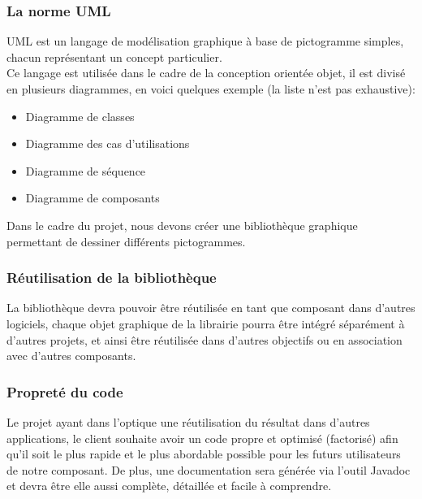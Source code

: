 \documentclass[12pt,a4paper,openany]{article}
\begin{document}
		\subsubsection{La norme UML} 
			UML est un langage de modélisation graphique à base de pictogramme simples, chacun représentant un concept particulier.\\
			Ce langage est utilisée dans le cadre de la conception orientée objet, il est divisé en plusieurs diagrammes, en voici quelques exemple (la liste n'est pas exhaustive): 
			\begin{itemize}
				\item Diagramme de classes
				\item Diagramme des cas d'utilisations
				\item Diagramme de séquence
				\item Diagramme de composants
			\end{itemize}
			Dans le cadre du projet, nous devons créer une bibliothèque graphique permettant de dessiner différents pictogrammes.
		\subsubsection{Réutilisation de la bibliothèque}
		La bibliothèque devra pouvoir être réutilisée en tant que composant dans d'autres logiciels,
		chaque objet graphique de la librairie pourra être intégré séparément à d'autres projets, 
		et ainsi être réutilisée dans d'autres objectifs ou en association avec d'autres composants.
		\subsubsection{Propreté du code}Le projet ayant dans l'optique une réutilisation du résultat dans d'autres applications,
		le client souhaite avoir un code propre et optimisé (factorisé) afin qu'il soit le plus rapide et le plus abordable possible pour
		les futurs utilisateurs de notre composant. De plus, une documentation sera générée via l'outil Javadoc et devra être elle aussi
		complète, détaillée et facile à comprendre.
\end{document}
